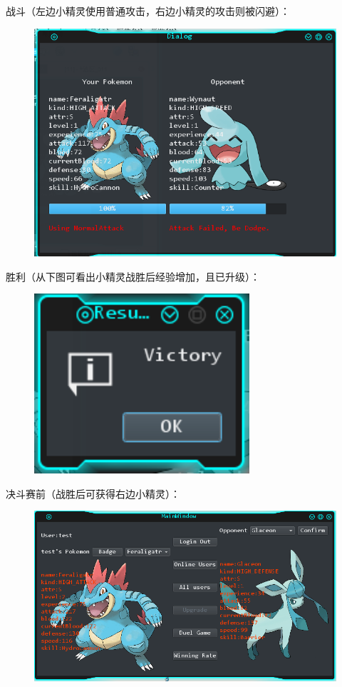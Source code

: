 \documentclass{ctexart}
\begin{document}
\pagebreak[4]
战斗（左边小精灵使用普通攻击，右边小精灵的攻击则被闪避）：
\begin{figure}[H]
  \centering
  \includegraphics[width=15cm]{stage3-fight.png}
\end{figure}
胜利（从下图可看出小精灵战胜后经验增加，且已升级）：
\begin{figure}[H]
  \centering
  \includegraphics[width=8cm]{stage3-victory.png}
\end{figure}
\pagebreak[4]
决斗赛前（战胜后可获得右边小精灵）：
\begin{figure}[H]
  \centering
  \includegraphics[width=15cm]{stage3-beforeDuel.png}
\end{figure}
\end{document}
